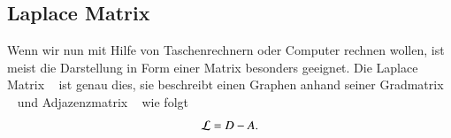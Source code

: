 \subsection{Laplace Matrix\label{subsec:sgwt:laplacem}}

Wenn wir nun mit Hilfe von Taschenrechnern oder Computer rechnen wollen, ist 
meist die Darstellung in Form einer Matrix besonders geeignet.
Die Laplace Matrix \laplaceL{}~\cite{noauthor_laplace-matrix_2017} ist genau 
dies, sie beschreibt einen Graphen anhand seiner Gradmatrix 
\degreeM{}~\cite{noauthor_degree_2018} und Adjazenzmatrix 
\adjacencyM{}~\cite{noauthor_adjacency_2019} wie folgt
\begin{equation}
\laplaceL = \degreeM - \adjacencyM.
\label{eq:sgwt:laplace}
\end{equation}

